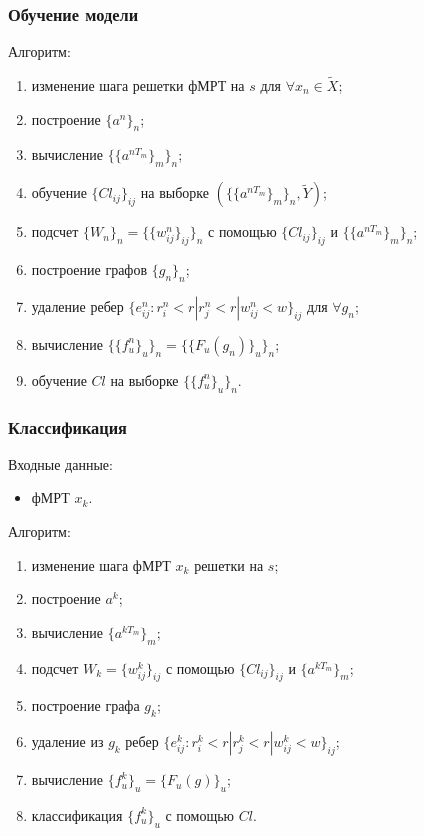 \documentclass{beamer}
\begin{document}
	\begin{frame} 
		\frametitle{Обучение модели}
		Алгоритм: 
		\begin{enumerate}
			\item изменение шага решетки фМРТ на $s$ для $\forall x_n \in \widetilde{X}$;
			\item построение $\{a^n\}_n$;
			\item вычисление $\{\{a^{nT_m}\}_{m}\}_n$;
			\item обучение  $\{Cl_{ij}\}_{ij}$ на выборке $(\{\{a^{nT_m}\}_{m}\}_n, \widetilde{Y})$;
			\item подсчет $\{W_n\}_n = \{\{w_{ij}^n\}_{ij}\}_n$ с помощью $\{Cl_{ij}\}_{ij}$ и $\{\{a^{nT_m}\}_{m}\}_n$;
			\item построение графов $\{g_n\}_n$;
			\item удаление ребер $\{e_{ij}^n : r_i^n < r | r_j^n < r | w_{ij}^n < w\}_{ij}$  для $\forall g_n$;
			\item вычисление $\{\{f^n_u\}_u\}_n = \{\{F_u(g_n)\}_u\}_n$;
			\item обучение $Cl$ на выборке $\{\{f^n_u\}_u\}_n$.
		\end{enumerate}
	\end{frame}

	\begin{frame} 
		\frametitle{Классификация}
		Входные данные:
		\begin{itemize}
			\item фМРТ $x_k$.
		\end{itemize}
		Алгоритм: 
		\begin{enumerate}
			\item изменение шага фМРТ $x_k$ решетки на $s$;
			\item построение $a^k$;
			\item вычисление $\{a^{kT_m}\}_{m}$;
			\item подсчет $W_k = \{w^k_{ij}\}_{ij}$ с помощью $\{Cl_{ij}\}_{ij}$ и $\{a^{kT_m}\}_{m}$;
			\item построение графа $g_k$;
			\item удаление из $g_k$ ребер $\{e^k_{ij} : r^k_i < r | r^k_j < r | w^k_{ij} < w\}_{ij}$;
			\item вычисление $\{f^k_u\}_u = \{F_u(g)\}_u$;
			\item классификация $\{f^k_u\}_u$ с помощью $Cl$.
		\end{enumerate}
	\end{frame}
	
\end{document}
